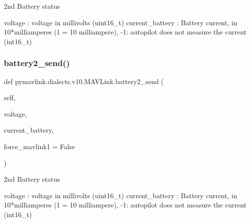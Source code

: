 \begin{DoxyVerb}2nd Battery status

voltage                   : voltage in millivolts (uint16_t)
current_battery           : Battery current, in 10*milliamperes (1 = 10 milliampere), -1: autopilot does not measure the current (int16_t)\end{DoxyVerb}
 \mbox{\label{classpymavlink_1_1dialects_1_1v10_1_1MAVLink_a0b6ba51655e34990d852b39678122e15}} 
\subsubsection{\texorpdfstring{battery2\+\_\+send()}{battery2\_send()}}
{\footnotesize\ttfamily def pymavlink.\+dialects.\+v10.\+M\+A\+V\+Link.\+battery2\+\_\+send (\begin{DoxyParamCaption}\item[{}]{self,  }\item[{}]{voltage,  }\item[{}]{current\+\_\+battery,  }\item[{}]{force\+\_\+mavlink1 = {\ttfamily False} }\end{DoxyParamCaption})}

\begin{DoxyVerb}2nd Battery status

voltage                   : voltage in millivolts (uint16_t)
current_battery           : Battery current, in 10*milliamperes (1 = 10 milliampere), -1: autopilot does not measure the current (int16_t)\end{DoxyVerb}
 \mbox{\label{classpymavlink_1_1dialects_1_1v10_1_1MAVLink_aad3718191198b6140e0cacb80b8b8749}} 
